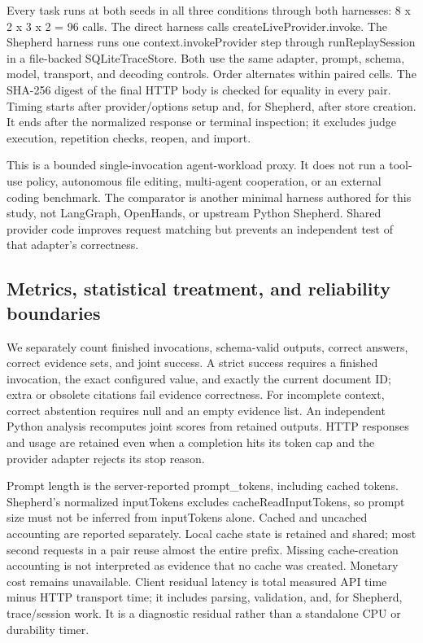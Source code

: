 \documentclass[11pt,a4paper]{article}
\begin{document}
Every task runs at both seeds in all three conditions through both harnesses: 8 x 2 x 3 x 2 = 96 calls. The direct harness calls createLiveProvider.invoke. The Shepherd harness runs one context.invokeProvider step through runReplaySession in a file-backed SQLiteTraceStore. Both use the same adapter, prompt, schema, model, transport, and decoding controls. Order alternates within paired cells. The SHA-256 digest of the final HTTP body is checked for equality in every pair. Timing starts after provider/options setup and, for Shepherd, after store creation. It ends after the normalized response or terminal inspection; it excludes judge execution, repetition checks, reopen, and import.


This is a bounded single-invocation agent-workload proxy. It does not run a tool-use policy, autonomous file editing, multi-agent cooperation, or an external coding benchmark. The comparator is another minimal harness authored for this study, not LangGraph, OpenHands, or upstream Python Shepherd. Shared provider code improves request matching but prevents an independent test of that adapter's correctness.


\subsection{Metrics, statistical treatment, and reliability boundaries}

We separately count finished invocations, schema-valid outputs, correct answers, correct evidence sets, and joint success. A strict success requires a finished invocation, the exact configured value, and exactly the current document ID; extra or obsolete citations fail evidence correctness. For incomplete context, correct abstention requires null and an empty evidence list. An independent Python analysis recomputes joint scores from retained outputs. HTTP responses and usage are retained even when a completion hits its token cap and the provider adapter rejects its stop reason.


Prompt length is the server-reported prompt\_tokens, including cached tokens. Shepherd's normalized inputTokens excludes cacheReadInputTokens, so prompt size must not be inferred from inputTokens alone. Cached and uncached accounting are reported separately. Local cache state is retained and shared; most second requests in a pair reuse almost the entire prefix. Missing cache-creation accounting is not interpreted as evidence that no cache was created. Monetary cost remains unavailable. Client residual latency is total measured API time minus HTTP transport time; it includes parsing, validation, and, for Shepherd, trace/session work. It is a diagnostic residual rather than a standalone CPU or durability timer.
\end{document}
